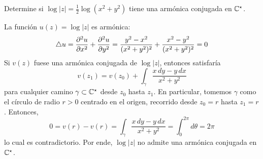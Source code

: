 \begin{exercise}
Determine si $\log |z| = \frac 12 \log(x^2 + y^2)$ tiene una armónica conjugada en $\mathbb C^\star$.
\end{exercise}

\begin{solution}
La función $u(z) = \log |z|$ es armónica:
$$\triangle u = \dfrac {\partial ^2 u} {\partial x^2} + \dfrac {\partial ^2 u} {\partial y^2} = \frac {y^2 - x^2} {(x^2 + y^2)^2} + \frac {x^2 - y^2} {(x^2 + y^2)^2} = 0$$
Si $v(z)$ fuese una armónica conjugada de $\log |z|$, entonces satisfaría
$$v(z_1) = v(z_0) + \int_\gamma \frac {x \, dy - y \, dx} {x^2 + y^2}$$
para cualquier camino $\gamma \subset \mathbb C^\star$ desde $z_0$ hasta $z_1$. En particular, tomemos $\gamma$ como el círculo de radio $r > 0$ centrado en el origen, recorrido desde $z_0 = r$ hasta $z_1 = r$. Entonces,
$$0 = v(r) - v(r) = \int_\gamma \frac {x \, dy - y \, dx} {x^2 + y^2} = \int_0^{2\pi} d\theta = 2\pi$$
lo cual es contradictorio. Por ende, $\log |z|$ no admite una armónica conjugada en $\mathbb C^\star$.
\end{solution}

